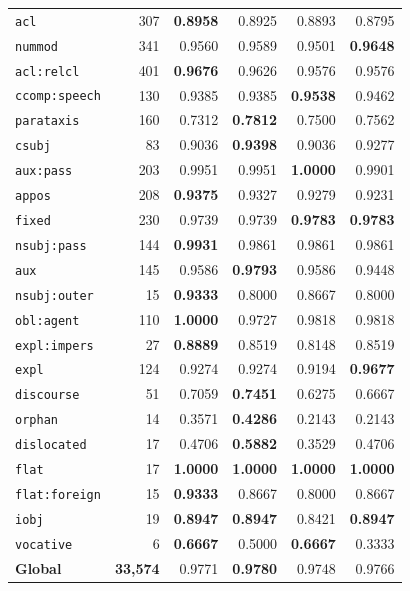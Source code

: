 \begin{table}[ht]
\begin{minipage}[t]{0.60\linewidth}
\begin{tabular}{l r  r r r r}
\texttt{acl} & 307 & \textbf{0.8958} & 0.8925 & 0.8893 & 0.8795 \\
\texttt{nummod} & 341 & 0.9560 & 0.9589 & 0.9501 & \textbf{0.9648} \\
\texttt{acl\!:\!relcl} & 401 & \textbf{0.9676} & 0.9626 & 0.9576 & 0.9576 \\
\texttt{ccomp\!:\!speech} & 130 & 0.9385 & 0.9385 & \textbf{0.9538} & 0.9462 \\
\texttt{parataxis} & 160 & 0.7312 & \textbf{0.7812} & 0.7500 & 0.7562 \\
\texttt{csubj} & 83 & 0.9036 & \textbf{0.9398} & 0.9036 & 0.9277 \\
\texttt{aux\!:\!pass} & 203 & 0.9951 & 0.9951 & \textbf{1.0000} & 0.9901 \\
\texttt{appos} & 208 & \textbf{0.9375} & 0.9327 & 0.9279 & 0.9231 \\
\texttt{fixed} & 230 & 0.9739 & 0.9739 & \textbf{0.9783} & \textbf{0.9783} \\
\texttt{nsubj\!:\!pass} & 144 & \textbf{0.9931} & 0.9861 & 0.9861 & 0.9861 \\
\texttt{aux} & 145 & 0.9586 & \textbf{0.9793} & 0.9586 & 0.9448 \\
\texttt{nsubj\!:\!outer} & 15 & \textbf{0.9333} & 0.8000 & 0.8667 & 0.8000 \\
\texttt{obl\!:\!agent} & 110 & \textbf{1.0000} & 0.9727 & 0.9818 & 0.9818 \\
\texttt{expl\!:\!impers} & 27 & \textbf{0.8889} & 0.8519 & 0.8148 & 0.8519 \\
\texttt{expl} & 124 & 0.9274 & 0.9274 & 0.9194 & \textbf{0.9677} \\
\texttt{discourse} & 51 & 0.7059 & \textbf{0.7451} & 0.6275 & 0.6667 \\
\texttt{orphan} & 14 & 0.3571 & \textbf{0.4286} & 0.2143 & 0.2143 \\
\texttt{dislocated} & 17 & 0.4706 & \textbf{0.5882} & 0.3529 & 0.4706 \\
\texttt{flat} & 17 & \textbf{1.0000} & \textbf{1.0000} & \textbf{1.0000} & \textbf{1.0000} \\
\texttt{flat\!:\!foreign} & 15 & \textbf{0.9333} & 0.8667 & 0.8000 & 0.8667 \\
\texttt{iobj} & 19 & \textbf{0.8947} & \textbf{0.8947} & 0.8421 & \textbf{0.8947} \\
\texttt{vocative} & 6 & \textbf{0.6667} & 0.5000 & \textbf{0.6667} & 0.3333 \\
\midrule
\textbf{Global} & \textbf{33,574} & 0.9771 & \textbf{0.9780} & 0.9748 & 0.9766 \\

\end{tabular}
\end{minipage}
\end{table}
